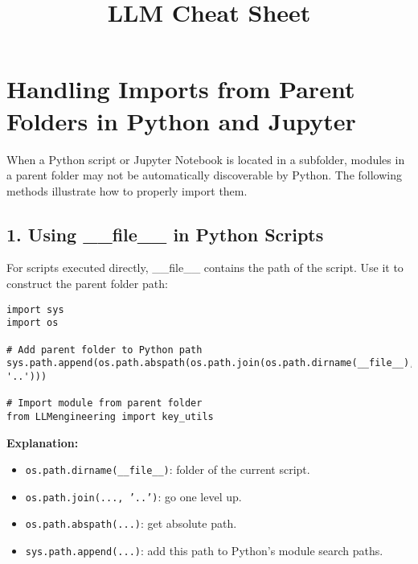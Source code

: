 \documentclass[a4paper, 12pt]{article}
\begin{document}
\title{LLM Cheat Sheet}
\maketitle

\tableofcontents

\newpage
\section*{Handling Imports from Parent Folders in Python and Jupyter}

When a Python script or Jupyter Notebook is located in a subfolder, modules in a parent folder may not be automatically discoverable by Python. The following methods illustrate how to properly import them.

\subsection*{1. Using \_\_file\_\_ in Python Scripts}

For scripts executed directly, \_\_file\_\_ contains the path of the script. Use it to construct the parent folder path:

\begin{tcolorbox}[colback=red!5,colframe=red!70!black,title=Python Script: Using \_\_file\_\_]
\begin{verbatim}
import sys
import os

# Add parent folder to Python path
sys.path.append(os.path.abspath(os.path.join(os.path.dirname(__file__), '..')))

# Import module from parent folder
from LLMengineering import key_utils
\end{verbatim}
\end{tcolorbox}

\textbf{Explanation:}
\begin{itemize}
    \item \texttt{os.path.dirname(\_\_file\_\_)}: folder of the current script.
    \item \texttt{os.path.join(..., '..')}: go one level up.
    \item \texttt{os.path.abspath(...)}: get absolute path.
    \item \texttt{sys.path.append(...)}: add this path to Python's module search paths.
\end{itemize}
\end{document}
